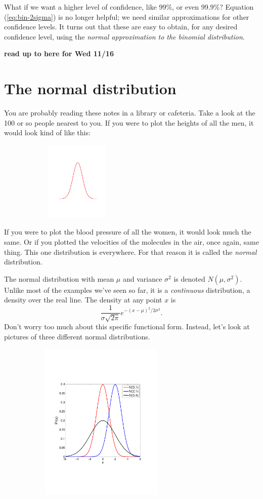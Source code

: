 What if we want a higher level of confidence, like 99\%, or even 99.9\%?
Equation (\ref{eq:bin-2sigma}) is no longer helpful; we need similar 
approximations for other confidence levels. It turns out that these are
easy to obtain, for any desired confidence level, using the {\it normal
approximation to the binomial distribution}.

{\bf read up to here for Wed 11/16}
\section{The normal distribution}

You are probably reading these notes in a library or cafeteria. Take a look
at the 100 or so people nearest to you. If you were to plot the heights of 
all the men, it would look kind of like this:

\begin{center}
\includegraphics[width=3in,height=1.5in]{figs/bell.pdf}
\end{center}

\noindent
If you were to plot the blood pressure of all the women, it would look much 
the same. Or if you plotted the velocities of the molecules in the air, once 
again, same thing. This one distribution is everywhere. For that reason it 
is called the {\it normal} distribution.

The normal distribution with mean $\mu$ and variance $\sigma^2$ is denoted
$N(\mu, \sigma^2)$. Unlike most of the examples we've seen so far, it is
a {\it continuous} distribution, a density over the real line. The density 
at any point $x$ is
$$ \frac{1}{\sigma \sqrt{2\pi}} e^{-(x-\mu)^2/2\sigma^2} .$$
Don't worry too much about this specific functional form. Instead, let's
look at pictures of three different normal distributions.

\begin{center}
\includegraphics[width=4in,height=3in]{figs/three-norm.pdf}
\end{center}

